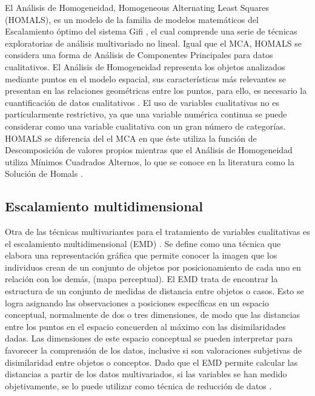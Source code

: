 \documentclass[water,article,submit,moreauthors,pdftex]{mdpi}
\begin{document}
El Análisis de Homogeneidad, Homogeneous Alternating Least Squares
(HOMALS), es un modelo de la familia de modelos matemáticos del
Escalamiento óptimo del sistema Gifi \citep{Gifi1990}, el cual comprende
una serie de técnicas exploratorias de análisis multivariado no lineal.
Igual que el MCA, HOMALS se considera una forma de Análisis de
Componentes Principales para datos cualitativos. El Análisis de
Homogeneidad representa los objetos analizados mediante puntos en el
modelo espacial, sus características más relevantes se presentan en las
relaciones geométricas entre los puntos, para ello, es necesario la
cuantificación de datos cualitativos \citep{Lopez2014}. El uso de
variables cualitativas no es particularmente restrictivo, ya que una
variable numérica continua se puede considerar como una variable
cualitativa con un gran número de categorías. HOMALS se diferencia del
el MCA en que éste utiliza la función de Descomposición de valores
propios mientras que el Análisis de Homogeneidad utiliza Mínimos
Cuadrados Alternos, lo que se conoce en la literatura como la Solución
de Homals \citep{michailidis1998}.

\hypertarget{escalamiento-multidimensional}{%
\subsection{Escalamiento
multidimensional}\label{escalamiento-multidimensional}}

Otra de las técnicas multivariantes para el tratamiento de variables
cualitativas es el escalamiento multidimensional (EMD)
\citep{torgerson1952, shepard1962}. Se define como una técnica que
elabora una representación gráfica que permite conocer la imagen que los
individuos crean de un conjunto de objetos por posicionamiento de cada
uno en relación con los demás, (mapa perceptual). El EMD trata de
encontrar la estructura de un conjunto de medidas de distancia entre
objetos o casos. Esto se logra asignando las observaciones a posiciones
específicas en un espacio conceptual, normalmente de dos o tres
dimensiones, de modo que las distancias entre los puntos en el espacio
concuerden al máximo con las disimilaridades dadas. Las dimensiones de
este espacio conceptual se pueden interpretar para favorecer la
comprensión de los datos, inclusive si son valoraciones subjetivas de
disimilaridad entre objetos o conceptos. Dado que el EMD permite
calcular las distancias a partir de los datos multivariados, si las
variables se han medido objetivamente, se lo puede utilizar como técnica
de reducción de datos \citep{perez2004}.
\end{document}
